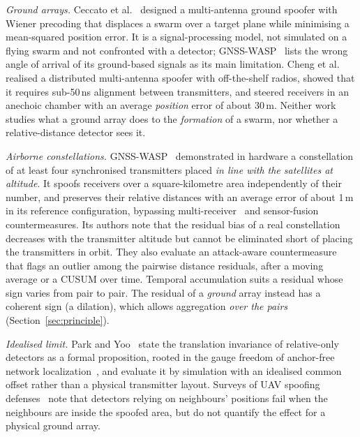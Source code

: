 \documentclass[conference]{IEEEtran}
\begin{document}
\emph{Ground arrays.} Ceccato et al.~\cite{ceccato2020spatial} designed
a multi-antenna ground spoofer with Wiener precoding that displaces a
swarm over a target plane while minimising a mean-squared position
error. It is a signal-processing model, not simulated on a flying swarm
and not confronted with a detector; GNSS-WASP~\cite{tibaldo2025gnsswasp}
lists the wrong angle of arrival of its ground-based signals as its main
limitation. Cheng et al.~\cite{cheng2025distributed} realised a
distributed multi-antenna spoofer with off-the-shelf radios, showed that
it requires sub-50\,ns alignment between transmitters, and steered
receivers in an anechoic chamber with an average \emph{position} error
of about 30\,m. Neither work studies what a ground array does to the
\emph{formation} of a swarm, nor whether a relative-distance detector
sees it.

\emph{Airborne constellations.} GNSS-WASP~\cite{tibaldo2025gnsswasp}
demonstrated in hardware a constellation of at least four synchronised
transmitters placed \emph{in line with the satellites at altitude}. It
spoofs receivers over a square-kilometre area independently of their
number, and preserves their relative distances with an average error of
about 1\,m in its reference configuration, bypassing
multi-receiver~\cite{jansen2016multireceiver} and
sensor-fusion~\cite{sathaye2022semperfi} countermeasures. Its authors
note that the residual bias of a real constellation decreases with the
transmitter altitude but cannot be eliminated short of placing the
transmitters in orbit. They also evaluate an attack-aware
countermeasure that flags an outlier among the pairwise distance
residuals, after a moving average or a CUSUM over time. Temporal
accumulation suits a residual whose sign varies from pair to pair. The
residual of a \emph{ground} array instead has a coherent sign (a
dilation), which allows aggregation \emph{over the pairs}
(Section~\ref{sec:principle}).

\emph{Idealised limit.} Park and Yoo~\cite{park2026rigidshift} state the
translation invariance of relative-only detectors as a formal
proposition, rooted in the gauge freedom of anchor-free network
localization~\cite{aspnes2006localization}, and evaluate it by
simulation with an idealised common offset rather than a physical
transmitter layout. Surveys of UAV spoofing
defenses~\cite{altaweel2023fanets,sebastian2026survey} note that
detectors relying on neighbours' positions fail when the neighbours are
inside the spoofed area, but do not quantify the effect for a physical
ground array.
\end{document}
